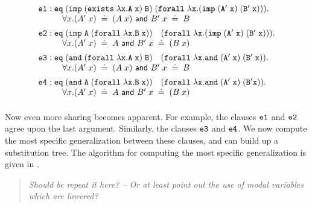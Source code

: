 \documentclass{acmconf}
\newcommand{\typeLF}{\tt{type}}
\newcommand{\propLF}{\tt{prop}}
\newcommand{\andLF}{\tt{and}\;}
\newcommand{\impLF}{\tt{imp}\;}
\newcommand{\forallLF}{\tt{forall}\;}
\newcommand{\existsLF}{\tt{exists}\;}
\newcommand{\eqLF}{\tt{eq}\;}
\newcommand{\eqilLF}{\tt{e1}}
\newcommand{\eqirLF}{\tt{e2}}
\newcommand{\eqalLF}{\tt{e3}}
\newcommand{\eqarLF}{\tt{e4}}
\newcommand{\unif}{\;\doteq\;}
\newenvironment{note}{\begin{quote}\message{note!}\it}{\end{quote}}
\begin{document}
\begin{small}
\[
\begin{array}{ll}
%
\eqilLF: \eqLF (\impLF (\existsLF \lambda x. A\; x)\; B)\;
                 (\forallLF \lambda x. (\impLF (A'\; x)\; (B'\;x))). \\
\hspace{1cm}\forall x. (A'\; x) \unif (A \; x) {\textsf{ and } } B'\;x   \unif B\\[0.5em]
\eqirLF: \eqLF (\impLF A\; (\forallLF \lambda x. B\;x))\quad
                 (\forallLF \lambda x. (\impLF (A'\;x) \; (B'\; x))).\\
\hspace{1cm} \forall x. (A'\; x) \unif A  {\textsf{ and }} B'\;x   \unif (B\;x)\\[0.5em]
\eqalLF: \eqLF (\andLF (\forallLF \lambda x. A \;x) \; B)\quad
                 (\forallLF \lambda x. \andLF (A'\; x) \; (B'\;x)).\\
\hspace{1cm} \forall x. (A'\; x) \unif (A \; x) {\textsf{ and }} B'\;x   \unif B\\[0.5em]
\eqarLF: \eqLF (\andLF A \; (\forallLF \lambda x. B\; x)) \quad
                 (\forallLF \lambda x. \andLF (A'\;x) \; (B' x)).\\
\hspace{1cm} \forall x. (A'\; x) \unif A  {\textsf{ and }} B'\;x   \unif (B\;x)\\[0.5em]
\end{array}
\]
\end{small}

Now even more sharing becomes apparent. For example, the clauses
$\eqilLF$ and $\eqirLF$ agree upon the last argument. Similarly, the
clauses $\eqalLF$ and $\eqarLF$. We now compute the most specific
generalization between these clauses, and can build up a substitution
tree. The algorithm for computing the most specific generalization is
given in \cite{Pientka03phd,Pientka:ICLP03}.

\begin{note}
  Should be repeat it here? -- Or at least point out the use of modal
  variables which are lowered?
\end{note}
\end{document}

